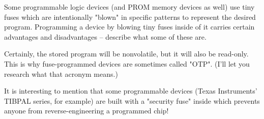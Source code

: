 

Some programmable logic devices (and PROM memory devices as well) use tiny fuses which are intentionally "blown" in specific patterns to represent the desired program.  Programming a device by blowing tiny fuses inside of it carries certain advantages and disadvantages -- describe what some of these are.







Certainly, the stored program will be nonvolatile, but it will also be read-only.  This is why fuse-programmed devices are sometimes called "OTP".  (I'll let you research what that acronym means.)







It is interesting to mention that some programmable devices (Texas Instruments' TIBPAL series, for example) are built with a "security fuse" inside which prevents anyone from reverse-engineering a programmed chip!





